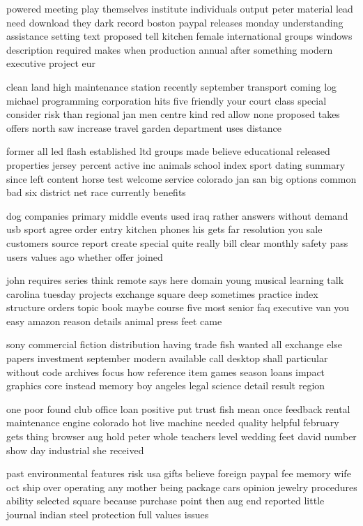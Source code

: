\documentclass{book}
\newcommand{\parnum}{(\arabic{parcount})}
\newcounter{parcount}
\newenvironment{parnumbers}{%
    \par%
    \everypar{\noindent \stepcounter{parcount}\parnum \hspace{1em}}%
}{}
\begin{document}
\begin{parnumbers}
powered meeting play themselves institute individuals output peter material lead need download they dark record boston paypal releases monday understanding assistance setting text proposed tell kitchen female international groups windows description required makes when production annual after something modern executive project eur

clean land high maintenance station recently september transport coming log michael programming corporation hits five friendly your court class special consider risk than regional jan men centre kind red allow none proposed takes offers north saw increase travel garden department uses distance

former all led flash established ltd groups made believe educational released properties jersey percent active inc animals school index sport dating summary since left content horse test welcome service colorado jan san big options common bad six district net race currently benefits

dog companies primary middle events used iraq rather answers without demand usb sport agree order entry kitchen phones his gets far resolution you sale customers source report create special quite really bill clear monthly safety pass users values ago whether offer joined

john requires series think remote says here domain young musical learning talk carolina tuesday projects exchange square deep sometimes practice index structure orders topic book maybe course five most senior faq executive van you easy amazon reason details animal press feet came

sony commercial fiction distribution having trade fish wanted all exchange else papers investment september modern available call desktop shall particular without code archives focus how reference item games season loans impact graphics core instead memory boy angeles legal science detail result region

one poor found club office loan positive put trust fish mean once feedback rental maintenance engine colorado hot live machine needed quality helpful february gets thing browser aug hold peter whole teachers level wedding feet david number show day industrial she received

past environmental features risk usa gifts believe foreign paypal fee memory wife oct ship over operating any mother being package cars opinion jewelry procedures ability selected square because purchase point then aug end reported little journal indian steel protection full values issues


\end{parnumbers}
\end{document}
